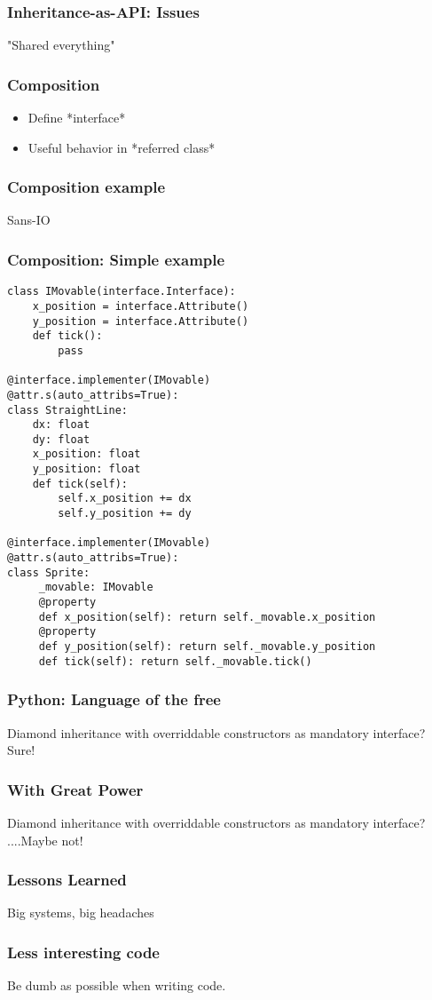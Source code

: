 \begin{frame}[fragile]
\frametitle{Inheritance-as-API: Issues}

"Shared everything"
\end{frame}

\begin{frame}[fragile]
\frametitle{Composition}

\begin{itemize}
\item Define *interface*
\item Useful behavior in *referred class*
\end{itemize}

\end{frame}

\begin{frame}[fragile]
\frametitle{Composition example}
Sans-IO
\end{frame}

\begin{frame}[fragile]
\frametitle{Composition: Simple example}
\begin{lstlisting}
class IMovable(interface.Interface):
    x_position = interface.Attribute()
    y_position = interface.Attribute()
    def tick():
        pass

@interface.implementer(IMovable)
@attr.s(auto_attribs=True):
class StraightLine:
    dx: float
    dy: float
    x_position: float
    y_position: float
    def tick(self):
        self.x_position += dx
        self.y_position += dy

@interface.implementer(IMovable)
@attr.s(auto_attribs=True):
class Sprite:
     _movable: IMovable
     @property
     def x_position(self): return self._movable.x_position
     @property
     def y_position(self): return self._movable.y_position
     def tick(self): return self._movable.tick()
\end{lstlisting}

\end{frame}

\begin{frame}[fragile]
\frametitle{Python: Language of the free}

Diamond inheritance with overriddable constructors as mandatory interface?
Sure!
\end{frame}

\begin{frame}[fragile]
\frametitle{With Great Power}

Diamond inheritance with overriddable constructors as mandatory interface?
....Maybe not!
\end{frame}

\begin{frame}[fragile]
\frametitle{Lessons Learned}

Big systems, big headaches
\end{frame}

\begin{frame}[fragile]
\frametitle{Less interesting code}

Be dumb as possible when writing code.

\end{frame}


